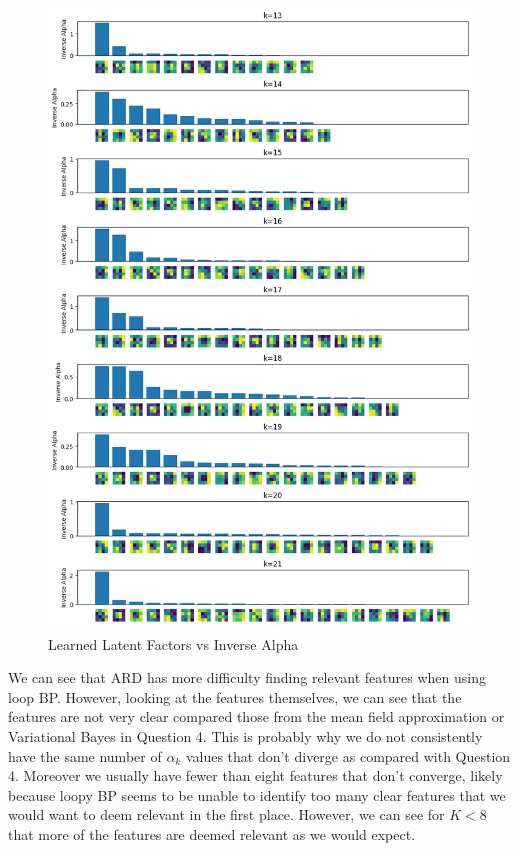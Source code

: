 \documentclass[12pt]{article}
\begin{document}
\newpage
\begin{figure}[h]
\centering
\includegraphics[scale=0.47]{outputs/q5/d-2-latent-factors-comparison}
\caption{Learned Latent Factors vs Inverse Alpha}
\label{fig:}
\end{figure}

We can see that ARD has more difficulty finding relevant features when using loop BP.
However, looking at the features themselves, we can see that the features are not very clear compared those from the mean field approximation or Variational Bayes in Question 4.
This is probably why we do not consistently have the same number of $\alpha_k$ values that don't diverge as compared with Question 4.
Moreover we usually have fewer than eight features that don't converge, likely because loopy BP seems to be unable to identify too many clear features that we would want to deem relevant in the first place.
However, we can see for $K<8$ that more of the features are deemed relevant as we would expect.
\end{document}
